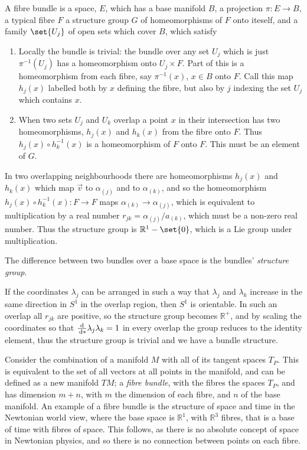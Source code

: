\begin{definition}
A fibre bundle is a space, $E$, which has a base manifold $B$, a
projection $\pi: E \to B$, a typical fibre $F$ a structure group $G$
of homeomorphisms of $F$ onto iteself, and a family $\set{U_j}$ of
open sets which cover $B$, which satisfy
\begin{enumerate}
\item Locally the bundle is trivial: the bundle over any set $U_j$
  which is just $\pi^{-1}(U_j)$ has a homeomorphism onto $U_j \times
  F$. Part of this is a homeomorphism from each fibre, say
  $\pi^{-1}(x)$, $x\in B$ onto $F$. Call this map $h_j(x)$ labelled
  both by $x$ defining the fibre, but also by $j$ indexing the set
  $U_j$ which contains $x$.
\item When two sets $U_j$ and $U_k$ overlap a point $x$ in their
  intersection has two homeomorphisms, $h_j(x)$ and $h_k(x)$ from the
  fibre onto $F$. Thus $h_j(x) \circ h_k^{-1}(x)$ is a homeomorphism
  of $F$ onto $F$. This must be an element of $G$.
\end{enumerate}
\end{definition}

In two overlapping neighbourhoods there are homeomorphisms $h_j(x)$
and $h_k(x)$ which map $\vec{v}$ to $\alpha_{(j)}$ and to
$\alpha_{(k)}$, and so the homeomorphism $h_j(x) \circ h_k^{-1}(x): F
\to F$ maps $\alpha_{(k)} \to \alpha_{(j)}$, which is equivalent to
multiplication by a real number $r_{jk} = \alpha_{(j)}/a_{(k)}$, which
must be a non-zero real number. Thus the structure group is
$\mathbb{R}^1 - \set{0}$, which is a Lie group under multiplication.

The difference between two bundles over a base space is the bundles'
\emph{structure group}.

If the coordinates $\lambda_j$ can be arranged in such a way that
$\lambda_j$ and $\lambda_k$ increase in the same direction in $S^1$ in
the overlap region, then $S^1$ is orientable. In such an overlap all
$r_{jk}$ are positive, so the structure group becomes $\mathbb{R}^+$,
and by scaling the coordinates so that $\frac{\mathrm{d}}{\,\mathrm{d} *}{\lambda_j}{\lambda_k} =
1$ in every overlap the group reduces to the identity element, thus
the structure group is trivial and we have a bundle structure.

Consider the combination of a manifold $M$ with all of its tangent
spaces $T_P$. This is equivalent to the set of all vectors at all
points in the manifold, and can be defined as a new manifold $TM$; a
\emph{fibre bundle}, with the fibres the spaces $T_P$, and has
dimension $m+n$, with $m$ the dimension of each fibre, and $n$ of the
base manifold. An example of a fibre bundle is the structure of space
and time in the Newtonian world view, where the base space is
$\mathbb{R}^1$, with $\mathbb{R}^3$ fibres, that is a base of time
with fibres of space. This follows, as there is no absolute concept of
space in Newtonian physics, and so there is no connection between
points on each fibre.

